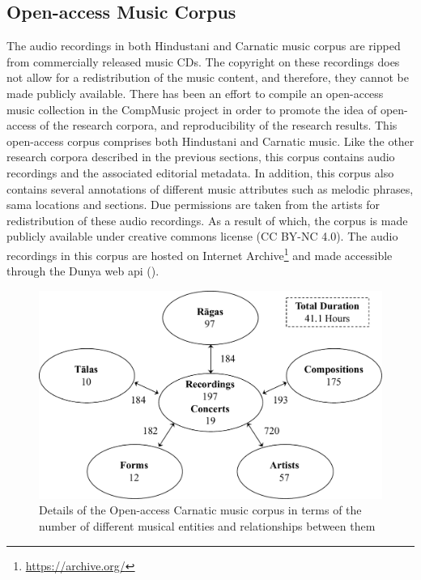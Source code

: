 \subsection{Open-access Music Corpus}
\label{sec:corpus_open_access_research_corpus}

The audio recordings in both Hindustani and Carnatic music corpus are ripped from commercially released music CDs. The copyright on these recordings does not allow for a redistribution of the music content, and therefore, they cannot be made publicly available. There has been an effort to compile an open-access music collection in the CompMusic project in order to promote the idea of open-access of the research corpora, and reproducibility of the research results. This open-access corpus comprises both Hindustani and Carnatic music. Like the other research corpora described in the previous sections, this corpus contains audio recordings and the associated editorial metadata. In addition, this corpus also contains several annotations of different music attributes such as melodic phrases, sama locations and sections. Due permissions are taken from the artists for redistribution of these audio recordings. As a result of which, the corpus is made publicly available under creative commons license (CC BY-NC 4.0). The audio recordings in this corpus are hosted on Internet Archive\footnote{\url{https://archive.org/}} and made accessible through the Dunya web \gls{api} (). 


\begin{figure}
	\begin{center}
		\includegraphics[width=\figSizeNinety]{ch04_datasets/figures/carnatic_corpus_cc.pdf}
	\end{center}
	\caption[Details of the Open-access Carnatic music corpus]{Details of the Open-access Carnatic music corpus in terms of the number of different musical entities and relationships between them}
	\label{fig:carnatic_cc_corpus_details}
\end{figure}

